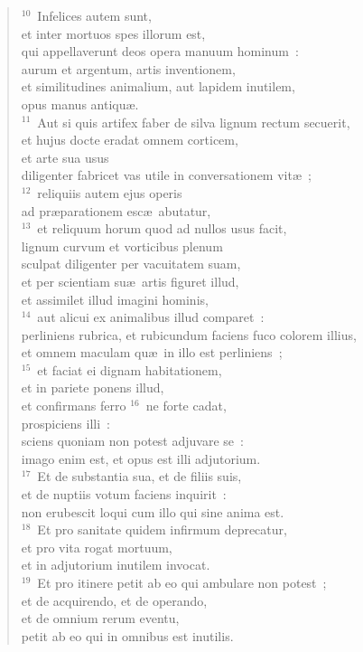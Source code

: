 \begin{flushleft}\begin{verse}${}^{10}$~Infelices autem sunt,\\ et inter mortuos spes illorum est,\\ qui appellaverunt deos opera manuum hominum~:\\ aurum et argentum, artis inventionem,\\ et similitudines animalium, aut lapidem inutilem,\\ opus manus antiqu\ae .\\
${}^{11}$~Aut si quis artifex faber de silva lignum rectum secuerit,\\ et hujus docte eradat omnem corticem,\\ et arte sua usus\\ diligenter fabricet vas utile in conversationem vit\ae~;\\
${}^{12}$~reliquiis autem ejus operis\\ ad pr\ae parationem esc\ae\ abutatur,\\
${}^{13}$~et reliquum horum quod ad nullos usus facit,\\ lignum curvum et vorticibus plenum\\ sculpat diligenter per vacuitatem suam,\\ et per scientiam su\ae\ artis figuret illud,\\ et assimilet illud imagini hominis,\\
${}^{14}$~aut alicui ex animalibus illud comparet~:\\ perliniens rubrica, et rubicundum faciens fuco colorem illius,\\ et omnem maculam qu\ae\ in illo est perliniens~;\\
${}^{15}$~et faciat ei dignam habitationem,\\ et in pariete ponens illud,\\ et confirmans ferro
${}^{16}$~ne forte cadat,\\ prospiciens illi~:\\ sciens quoniam non potest adjuvare se~:\\ imago enim est, et opus est illi adjutorium.\\
${}^{17}$~Et de substantia sua, et de filiis suis,\\ et de nuptiis votum faciens inquirit~:\\ non erubescit loqui cum illo qui sine anima est.\\
${}^{18}$~Et pro sanitate quidem infirmum deprecatur,\\ et pro vita rogat mortuum,\\ et in adjutorium inutilem invocat.\\
${}^{19}$~Et pro itinere petit ab eo qui ambulare non potest~;\\ et de acquirendo, et de operando,\\ et de omnium rerum eventu,\\ petit ab eo qui in omnibus est inutilis.\end{verse}\end{flushleft}


